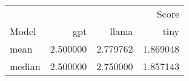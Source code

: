 \begin{tabular}{lrrr}
\toprule
 & \multicolumn{3}{r}{Score} \\
Model & gpt & llama & tiny \\
\midrule
mean & 2.500000 & 2.779762 & 1.869048 \\
median & 2.500000 & 2.750000 & 1.857143 \\
\bottomrule
\end{tabular}
